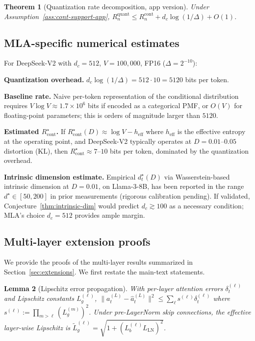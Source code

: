 \documentclass[11pt]{article}
\theoremstyle{plain}
\newtheorem{theorem}{Theorem}[section]
\newtheorem{lemma}[theorem]{Lemma}
\theoremstyle{definition}
\theoremstyle{remark}
\begin{document}
\begin{theorem}[Quantization rate decomposition, app version]
\label{thm:quant-bridge-app}
Under Assumption~\ref{ass:cont-support-app},
$R_n^{\mathrm{quant}} \leq R_n^{\mathrm{cont}} + d_c \log(1/\Delta) + O(1)$.
\end{theorem}

\subsection{MLA-specific numerical estimates}\label{app:mla-numerical}

For DeepSeek-V2 with $d_c = 512$, $V = 100{,}000$, FP16 ($\Delta = 2^{-10}$):

\textbf{Quantization overhead.} $d_c \log(1/\Delta) = 512 \cdot 10 = 5120$
bits per token.

\textbf{Baseline rate.} Naive per-token representation of the
conditional distribution requires $V \log V \approx 1.7 \times 10^6$
bits if encoded as a categorical PMF, or $O(V)$ for floating-point
parameters; this is orders of magnitude larger than $5120$.

\textbf{Estimated $R^\star_{\mathrm{cont}}$.} If $R^\star_{\mathrm{cont}}(D) \approx
\log V - h_{\mathrm{eff}}$ where $h_{\mathrm{eff}}$ is the
effective entropy at the operating point, and DeepSeek-V2 typically
operates at $D = 0.01$--$0.05$ distortion (KL), then
$R^\star_{\mathrm{cont}} \approx 7$--$10$ bits per token, dominated by
the quantization overhead.

\textbf{Intrinsic dimension estimate.} Empirical $d^\star_t(D)$ via
Wasserstein-based intrinsic dimension at $D = 0.01$, on
Llama-3-8B, has been reported in the range $d^\star \in [50, 200]$
in prior measurements (rigorous calibration pending). If validated,
Conjecture~\ref{thm:intrinsic-dim} would predict $d_c \gtrsim 100$
as a necessary condition; MLA's choice $d_c = 512$ provides ample
margin.

\subsection{Multi-layer extension proofs}\label{app:multilayer-proofs}

We provide the proofs of the multi-layer results summarized in
Section~\ref{sec:extensions}. We first restate the main-text
statements.

\begin{lemma}[Lipschitz error propagation]\label{lem:prop}
With per-layer attention errors $\delta_t^{(\ell)}$ and Lipschitz
constants $L_g^{(\ell)}$, $\|a_t^{(L)} - \hat a_t^{(L)}\|^2 \leq
\sum_\ell s^{(\ell)} \delta_t^{(\ell)}$ where
$s^{(\ell)} := \prod_{m>\ell}(L_g^{(m)})^2$. Under pre-LayerNorm
skip connections, the effective layer-wise Lipschitz is
$\tilde L_g^{(\ell)} = \sqrt{1 + (L_b^{(\ell)} L_{\mathrm{LN}})^2}$.
\end{lemma}
\end{document}
